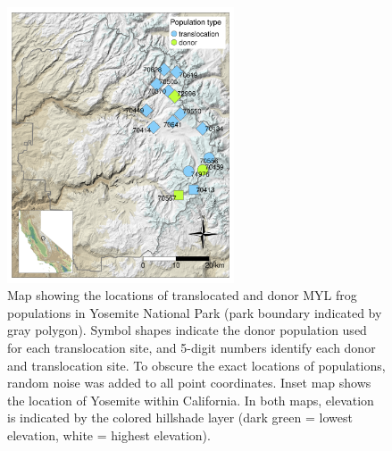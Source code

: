 \documentclass[9pt,twoside,lineno]{pnas-new}
\begin{document}
\begin{figure}

{\centering \includegraphics[width=0.60\textwidth]{figures/map_translocation_points.png}

}

\caption{\label{fig-yosemap}Map showing the locations of translocated
and donor MYL frog populations in Yosemite National Park (park boundary
indicated by gray polygon). Symbol shapes indicate the donor population
used for each translocation site, and 5-digit numbers identify each
donor and translocation site. To obscure the exact locations of
populations, random noise was added to all point coordinates. Inset map
shows the location of Yosemite within California. In both maps,
elevation is indicated by the colored hillshade layer (dark green =
lowest elevation, white = highest elevation).}

\end{figure}\clearpage

\newpage
\end{document}
